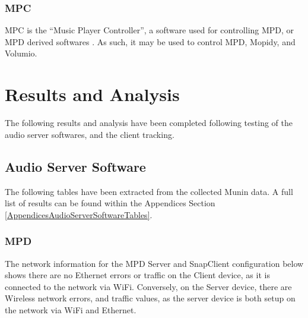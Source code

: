 \documentclass[11pt,a4paper]{scrreprt}
\begin{document}
\subsection{MPC}\label{mpc}

MPC is the ``Music Player Controller'', a software used for controlling
MPD, or MPD derived softwares \cite{mpc}. As such, it may be used to
control MPD, Mopidy, and Volumio.

\chapter{Results and Analysis}\label{results-and-analysis}

The following results and analysis have been completed following testing
of the audio server softwares, and the client tracking.

\section{\texorpdfstring{Audio Server Software
\label{AudioServerSoftwareResults}}{Audio Server Software }}\label{audio-server-software}

The following tables have been extracted from the collected Munin data.
A full list of results can be found within the Appendices Section
\ref{AppendicesAudioServerSoftwareTables}.

\subsection{MPD}\label{mpd-1}

The network information for the MPD Server and SnapClient configuration
below shows there are no Ethernet errors or traffic on the Client
device, as it is connected to the network via WiFi. Conversely, on the
Server device, there are Wireless network errors, and traffic values, as
the server device is both setup on the network via WiFi and Ethernet.
\end{document}
